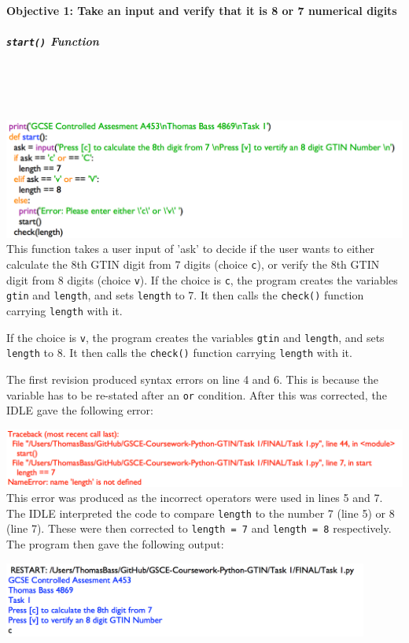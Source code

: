 \documentclass[a4paper]{article}
\begin{document}
\paragraph{Objective 1: Take an input and verify that it is 8 or 7 numerical digits}
\subparagraph{\texttt{start()} Function} ~ \par ~ \par
\noindent\includegraphics[width=1\textwidth, left, width=\linewidth, frame]{task1_start()functionDev.png}
This function takes a user input of 'ask' to decide if the user wants to either calculate the 8th GTIN digit from 7 digits (choice \verb|c|), or verify the 8th GTIN digit from 8 digits (choice \verb|v|). 
If the choice is \verb|c|, the program creates the variables \verb|gtin| and \verb|length|, and sets \verb|length| to 7. It then calls the \verb|check()| function carrying \verb|length| with it. \par
If the choice is \verb|v|, the program creates the variables \verb|gtin| and \verb|length|, and sets \verb|length| to 8. It then calls the \verb|check()| function carrying \verb|length| with it. \par
The first revision produced syntax errors on line 4 and 6. This is because the variable has to be re-stated after an \verb|or| condition. After this was corrected, the IDLE gave the following error: \par
\noindent\includegraphics[width=1\textwidth, left, width=\linewidth, frame]{task1_start()functionDev2.png}
This error was produced as the incorrect operators were used in lines 5 and 7. The IDLE interpreted the code to compare \verb|length| to the number 7 (line 5) or 8 (line 7). These were then corrected to \verb|length = 7| and \verb|length = 8| respectively. The program then gave the following output: \par
\noindent\includegraphics[width=0.9\textwidth, left, width=\linewidth, frame]{task1_start()functionDev3.png} \par
\end{document}
